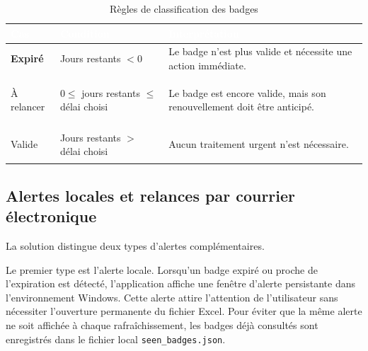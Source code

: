 \documentclass[12pt,a4paper,openany]{report}
\begin{document}
\begin{table}[H]
\centering
\small
\renewcommand{\arraystretch}{1.5} %
\setlength{\arrayrulewidth}{1pt} %

\begin{tabularx}{\textwidth}{|>{\raggedright\arraybackslash\bfseries}p{}|>{\raggedright\arraybackslash}p{}|>{\raggedright\arraybackslash}X|}
\hline
\rowcolor{ondaBlue} 
\textcolor{white}{\textbf{Cas}} & \textcolor{white}{\textbf{Condition}} & \textcolor{white}{\textbf{Interprétation}} \\
\hline

\rowcolor{ondaBlue!5} 
Expiré & Jours restants $< 0$ & Le badge n'est plus valide et nécessite une action immédiate. \\
\hline

À relancer & $0 \leq$ jours restants $\leq$ délai choisi & Le badge est encore valide, mais son renouvellement doit être anticipé. \\
\hline

\rowcolor{ondaBlue!5} 
Valide & Jours restants $>$ délai choisi & Aucun traitement urgent n'est nécessaire. \\
\hline

\end{tabularx}
\caption{Règles de classification des badges}
\label{tab:regles-classification}
\end{table}

\subsection{Alertes locales et relances par courrier électronique}

La solution distingue deux types d'alertes complémentaires.

Le premier type est l'alerte locale. Lorsqu'un badge expiré ou proche de
l'expiration est détecté, l'application affiche une fenêtre d'alerte persistante
dans l'environnement Windows. Cette alerte attire l'attention de l'utilisateur
sans nécessiter l'ouverture permanente du fichier Excel. Pour éviter que la même
alerte ne soit affichée à chaque rafraîchissement, les badges déjà consultés
sont enregistrés dans le fichier local \texttt{seen\_badges.json}.
\end{document}
